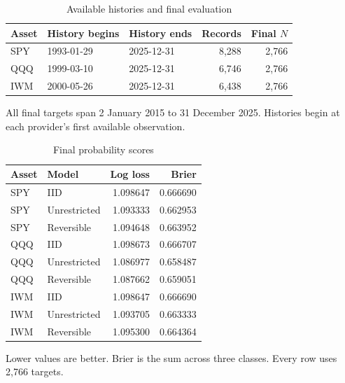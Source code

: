 \begin{table}[!htbp]\centering\small\setlength{\tabcolsep}{10pt}
\caption{Available histories and final evaluation}\label{tab:data}
\begin{tabular}{l ll rr}\toprule
Asset & History begins & History ends & Records & Final $N$\\\midrule
SPY & 1993-01-29 & 2025-12-31 & 8,288 & 2,766\\
QQQ & 1999-03-10 & 2025-12-31 & 6,746 & 2,766\\
IWM & 2000-05-26 & 2025-12-31 & 6,438 & 2,766\\
\bottomrule\end{tabular}
\par\smallskip\parbox{0.98\linewidth}{\footnotesize All final targets span 2 January 2015 to 31 December 2025. Histories begin at each provider's first available observation.}
\end{table}

\begin{table}[!htbp]\centering\small\setlength{\tabcolsep}{10pt}
\caption{Final probability scores}\label{tab:scores}
\begin{tabular}{llrr}\toprule
Asset & Model & Log loss & Brier\\\midrule
SPY & IID & 1.098647 & 0.666690\\
SPY & Unrestricted & 1.093333 & 0.662953\\
SPY & Reversible & 1.094648 & 0.663952\\
QQQ & IID & 1.098673 & 0.666707\\
QQQ & Unrestricted & 1.086977 & 0.658487\\
QQQ & Reversible & 1.087662 & 0.659051\\
IWM & IID & 1.098647 & 0.666690\\
IWM & Unrestricted & 1.093705 & 0.663333\\
IWM & Reversible & 1.095300 & 0.664364\\
\bottomrule\end{tabular}
\par\smallskip\parbox{0.98\linewidth}{\footnotesize Lower values are better. Brier is the sum across three classes. Every row uses 2,766 targets.}
\end{table}

